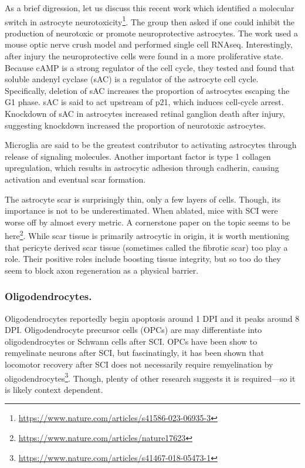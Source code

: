 As a brief digression, let us discuss this recent work which identified  a molecular switch in astrocyte neurotoxicity\footnote{\url{https://www.nature.com/articles/s41586-023-06935-3}}. The group then asked if one could inhibit the production of neurotoxic or promote neuroprotective astrocytes. The work used a mouse optic nerve crush model and performed single cell RNAseq. Interestingly, after injury the neuroprotective cells were found in a more proliferative state. Because cAMP is a strong regulator of the cell cycle, they tested and found that soluble andenyl cyclase (sAC) is a regulator of the astrocyte cell cycle. Specifically, deletion of sAC increases the proportion of astrocytes escaping the G1 phase. sAC is said to act upstream of p21, which induces cell-cycle arrest. Knockdown of sAC in astrocytes increased retinal ganglion death after injury, suggesting knockdown increased the proportion of neurotoxic astrocytes. \newline

 Microglia are said to be the greatest contributor to activating astrocytes through release of signaling molecules. Another important factor is type 1 collagen upregulation, which results in astrocytic adhesion through cadherin, causing activation and eventual scar formation.\newline

The astrocyte scar is surprisingly thin, only a few layers of cells. Though, its importance is not to be underestimated. When ablated, mice with SCI were worse off by almost every metric. A cornerstone paper on the topic seems to be here\footnote{\url{https://www.nature.com/articles/nature17623}}. While scar tissue is primarily astrocytic in origin, it is worth mentioning that pericyte derived scar tissue (sometimes called the fibrotic scar) too play a role. Their positive roles include boosting tissue integrity, but so too do they seem to block axon regeneration as a physical barrier. 

\subsubsection{Oligodendrocytes.}
Oligodendrocytes reportedly begin apoptosis around 1 DPI and it peaks around 8 DPI. Oligodendrocyte precursor cells (OPCs) are may differentiate into oligodendrocytes or Schwann cells after SCI. OPCs have been show to remyelinate neurons after SCI, but fascinatingly, it has been shown that locomotor recovery after SCI does not necessarily require remyelination by oligodendrocytes\footnote{\url{https://www.nature.com/articles/s41467-018-05473-1}}. Though, plenty of other research suggests it is required---so it is likely context dependent. 

